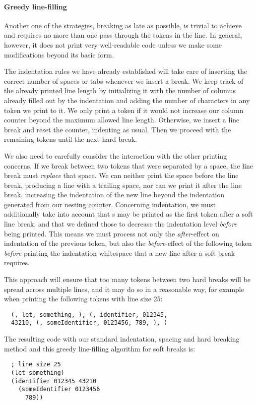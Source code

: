 \paragraph{Greedy line-filling}
Another one of the strategies, breaking as late as possible,
is trivial to achieve and requires no more than one pass through the tokens in the line.
In general, however, it does not print very well-readable code
unless we make some modifications beyond its basic form.

The indentation rules we have already established will take care of inserting
the correct number of spaces or tabs whenever we insert a break.
We keep track of the already printed line length by initializing it with the
number of columns already filled out by the indentation and adding the number
of characters in any token we print to it.
We only print a token if it would not increase our column counter beyond
the maximum allowed line length.
Otherwise, we insert a line break and reset the counter, indenting as usual.
Then we proceed with the remaining tokens until the next hard break.

We also need to carefully consider the interaction with the other printing concerns.
If we break between two tokens that were separated by a space,
the line break must \textit{replace} that space.
We can neither print the space before the line break, producing a line with a trailing space,
nor can we print it after the line break, increasing the indentation of the new line
beyond the indentation generated from our nesting counter.
Concerning indentation, we must additionally take into account that s
may be printed as the first token after a soft line break,
and that we defined those to decrease the indentation level \textit{before} being printed.
This means we must process not only the \textit{after}-effect on indentation of the previous token,
but also the \textit{before}-effect of the following token \textit{before}
printing the indentation whitespace that a new line after a soft break requires.

This approach will ensure that too many tokens between two hard breaks will be spread
across multiple lines, and it may do so in a reasonable way,
for example when printing the following tokens with line size 25:
\begin{verbatim}
  (, let, something, ), (, identifier, 012345,
  43210, (, someIdentifier, 0123456, 789, ), )
\end{verbatim}
The resulting code with our standard indentation, spacing and hard breaking method
and this greedy line-filling algorithm for soft breaks is:
\begin{verbatim}
  ; line size 25
  (let something)
  (identifier 012345 43210
    (someIdentifier 0123456
      789))
\end{verbatim}
